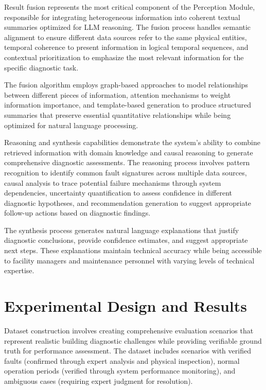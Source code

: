 Result fusion represents the most critical component of the Perception Module, responsible for integrating heterogeneous information into coherent textual summaries optimized for LLM reasoning. The fusion process handles semantic alignment to ensure different data sources refer to the same physical entities, temporal coherence to present information in logical temporal sequences, and contextual prioritization to emphasize the most relevant information for the specific diagnostic task.

The fusion algorithm employs graph-based approaches to model relationships between different pieces of information, attention mechanisms to weight information importance, and template-based generation to produce structured summaries that preserve essential quantitative relationships while being optimized for natural language processing.

Reasoning and synthesis capabilities demonstrate the system's ability to combine retrieved information with domain knowledge and causal reasoning to generate comprehensive diagnostic assessments. The reasoning process involves pattern recognition to identify common fault signatures across multiple data sources, causal analysis to trace potential failure mechanisms through system dependencies, uncertainty quantification to assess confidence in different diagnostic hypotheses, and recommendation generation to suggest appropriate follow-up actions based on diagnostic findings.

The synthesis process generates natural language explanations that justify diagnostic conclusions, provide confidence estimates, and suggest appropriate next steps. These explanations maintain technical accuracy while being accessible to facility managers and maintenance personnel with varying levels of technical expertise.

\section{Experimental Design and Results}

Dataset construction involves creating comprehensive evaluation scenarios that represent realistic building diagnostic challenges while providing verifiable ground truth for performance assessment. The dataset includes scenarios with verified faults (confirmed through expert analysis and physical inspection), normal operation periods (verified through system performance monitoring), and ambiguous cases (requiring expert judgment for resolution).

